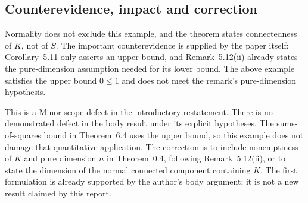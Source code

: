 \documentclass[10pt]{article}
\begin{document}
\subsection*{Counterevidence, impact and correction}
Normality does not exclude this example, and the theorem states connectedness of \(K\), not of \(S\). The important counterevidence is supplied by the paper itself: Corollary 5.11 only asserts an upper bound, and Remark 5.12(ii) already states the pure-dimension assumption needed for its lower bound. The above example satisfies the upper bound \(0\le1\) and does not meet the remark’s pure-dimension hypothesis.\par
This is a Minor scope defect in the introductory restatement. There is no demonstrated defect in the body result under its explicit hypotheses. The sums-of-squares bound in Theorem 6.4 uses the upper bound, so this example does not damage that quantitative application. The correction is to include nonemptiness of \(K\) and pure dimension \(n\) in Theorem 0.4, following Remark 5.12(ii), or to state the dimension of the normal connected component containing \(K\). The first formulation is already supported by the author’s body argument; it is not a new result claimed by this report.\par
\end{document}
